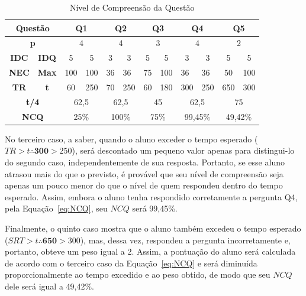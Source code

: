 \begin{table}[htbp]
\caption{Nível de Compreensão da Questão}
\centering
\begin{tabular}{|c|c|c|c|c|c|c|c|c|c|c|c|}
\hline
\multicolumn{2}{|c|}{\textbf{Questão}} & \multicolumn{2}{c|}{\textbf{Q1}} & \multicolumn{2}{c|}{\textbf{Q2}} & \multicolumn{2}{c|}{\textbf{Q3}} & \multicolumn{2}{c|}{\textbf{Q4}} & \multicolumn{2}{c|}{\textbf{Q5}} \\ \hline
\multicolumn{2}{|c|}{\textbf{p}} & \multicolumn{2}{c|}{4} & \multicolumn{2}{c|}{4} & \multicolumn{2}{c|}{3} & \multicolumn{2}{c|}{4} & \multicolumn{2}{c|}{2} \\ \hline
\textbf{IDC} & \textbf{IDQ} & 5 & 5 & 3 & 3 & 5 & 5 & 3 & 3 & 5 & 5 \\ \hline
\multicolumn{1}{|l|}{\textbf{NEC}} & \multicolumn{1}{l|}{\textbf{Max}} & \multicolumn{1}{l|}{100} & \multicolumn{1}{l|}{100} & \multicolumn{1}{l|}{36} & \multicolumn{1}{l|}{36} & \multicolumn{1}{l|}{75} & \multicolumn{1}{l|}{100} & \multicolumn{1}{l|}{36} & \multicolumn{1}{l|}{36} & 50 & 100 \\ \hline
\textbf{TR} & \textbf{t} & 60 & 250 & 70 & 250 & 60 & 180 & 300 & 250 & 650 & 300 \\ \hline
\multicolumn{2}{|c|}{\textbf{t/4}} & \multicolumn{2}{c|}{62,5} & \multicolumn{2}{c|}{62,5} & \multicolumn{2}{c|}{45} & \multicolumn{2}{c|}{62,5} & \multicolumn{2}{c|}{75} \\ \hline
\multicolumn{2}{|c|}{\textbf{NCQ}} & \multicolumn{2}{c|}{25\%} & \multicolumn{2}{c|}{100\%} & \multicolumn{2}{c|}{75\%} & \multicolumn{2}{c|}{99,45\%} & \multicolumn{2}{c|}{49,42\%} \\ \hline
\end{tabular}
\label{tab:QCL_1st}
\end{table}

No terceiro caso, a saber, quando o aluno exceder o tempo esperado ($TR > t \therefore \textbf{300} > 250$), será descontado um pequeno valor apenas para distingui-lo do segundo caso, independentemente de sua resposta. Portanto, se esse aluno atrasou mais do que o previsto, é provável que seu nível de compreensão seja apenas um pouco menor do que o nível de quem respondeu dentro do tempo esperado. Assim, embora o aluno tenha respondido corretamente a pergunta Q4, pela Equação~\ref{eq:NCQ}, seu $NCQ$ será 99,45\%.

Finalmente, o quinto caso mostra que o aluno também excedeu o tempo esperado ($SRT > t \therefore \textbf{650} > 300 $), mas, dessa vez, respondeu a pergunta incorretamente e, portanto, obteve um peso igual a 2. Assim, a pontuação do aluno será calculada de acordo com o terceiro caso da Equação~\ref{eq:NCQ} e será diminuída proporcionalmente ao tempo excedido e ao peso obtido, de modo que seu $NCQ$ dele será igual a 49,42\%.



